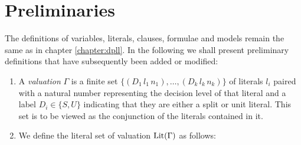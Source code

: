\section{Preliminaries}
The definitions of variables, literals, clauses, formulae and models remain the same as in chapter \ref{chapter:dpll}. In the following we shall present preliminary definitions that have subsequently been added or modified: \\
%
%
\begin{mydef}
\hspace{3mm}
\begin{enumerate}

%
%
%
%
%
%
%
\item A \emph{valuation} $\Gamma$ is a finite set $\{ (D_1 \, l_1 \, n_1), \ldots , ( D_k \, l_k \, n_k) \}$ of literals $l_i$ paired with a natural number representing the decision level of that literal and a label $D_i \in \{S, U\}$ indicating that they are either a split or unit literal. This set is to be viewed as the conjunction of the literals contained in it.
%
\item We define the literal set of valuation $\mathrm{Lit}(\Gamma)$ as follows:

\end{enumerate}
\end{mydef}
